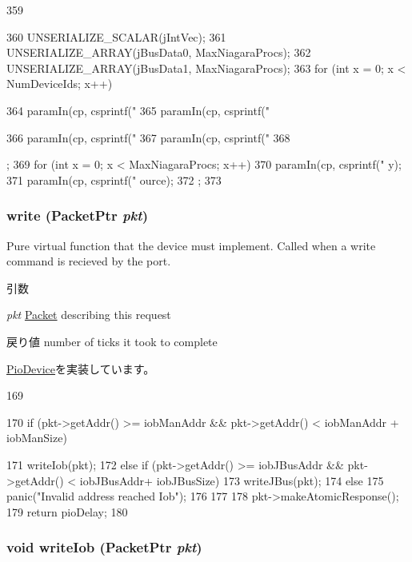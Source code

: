 \begin{DoxyCode}
359 {
360     UNSERIALIZE_SCALAR(jIntVec);
361     UNSERIALIZE_ARRAY(jBusData0, MaxNiagaraProcs);
362     UNSERIALIZE_ARRAY(jBusData1, MaxNiagaraProcs);
363     for (int x = 0; x < NumDeviceIds; x++) {
364         paramIn(cp, csprintf("%
365         paramIn(cp, csprintf("%
      
366         paramIn(cp, csprintf("%
367         paramIn(cp, csprintf("%
368     };
369     for (int x = 0; x < MaxNiagaraProcs; x++) {
370         paramIn(cp, csprintf("%
      y);
371         paramIn(cp, csprintf("%
      ource);
372     };
373 }
\end{DoxyCode}
\hypertarget{classIob_a4cefab464e72b5dd42c003a0a4341802}{
\subsubsection[{write}]{ write ({\bf PacketPtr} {\em pkt})}}
\label{classIob_a4cefab464e72b5dd42c003a0a4341802}
Pure virtual function that the device must implement. Called when a write command is recieved by the port. 
\begin{DoxyParams}{引数}
\item[{\em pkt}]\hyperlink{classPacket}{Packet} describing this request \end{DoxyParams}
\begin{DoxyReturn}{戻り値}
number of ticks it took to complete 
\end{DoxyReturn}


\hyperlink{classPioDevice_afe8371668d023bb2516b286e5e399b6f}{PioDevice}を実装しています。


\begin{DoxyCode}
169 {
170     if (pkt->getAddr() >= iobManAddr && pkt->getAddr() < iobManAddr + iobManSize)
      
171         writeIob(pkt);
172     else if (pkt->getAddr() >= iobJBusAddr && pkt->getAddr() < iobJBusAddr+
      iobJBusSize)
173         writeJBus(pkt);
174     else
175         panic("Invalid address reached Iob\n");
176 
177 
178     pkt->makeAtomicResponse();
179     return pioDelay;
180 }
\end{DoxyCode}
\hypertarget{classIob_a4683924656f7e6ca641aab7310aae530}{
\subsubsection[{writeIob}]{\setlength{\rightskip}{0pt plus 5cm}void writeIob ({\bf PacketPtr} {\em pkt})}}
\label{classIob_a4683924656f7e6ca641aab7310aae530}



